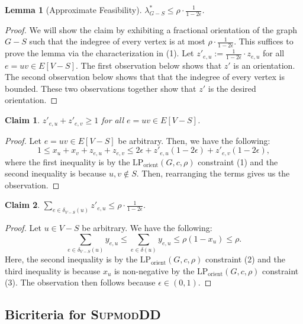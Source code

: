 \documentclass{article}
\newtheorem{lemma}{Lemma}[section]
\newtheorem{claim}{Claim}[section]
\newcommand{\supmoddensitydeletionset}{\textsc{SupmodDD}\xspace}
\begin{document}
\begin{lemma}[Approximate Feasibility] \label{lem:bicriteria-LP-rounding:approximate-feasibility}
    $\lambda^*_{G - S} \leq \rho\cdot \frac{1}{1 - 2\epsilon}$.
\end{lemma}
\begin{proof}
    We will show the claim by exhibiting a fractional orientation of the graph $G-S$ such that the indegree of every vertex is at most $\rho\cdot \frac{1}{1 - 2\epsilon}$. This suffices to prove the lemma via the characterization in  (1). 
    Let $z'_{e, u} := \frac{1}{1 - 2\epsilon}\cdot z_{e,u}$ for all $e = uv \in E[V - S]$. The first observation below shows that $z'$ is an orientation. The second observation below shows that that the indegree of every vertex is bounded.
    These two observations together show that $z'$ is the desired orientation. 
    \end{proof}
    \begin{claim}
        $z'_{e, u} + z'_{e,v} \geq 1$ for all $e = uv \in E[V - S]$.
    \end{claim}
    \begin{proof}
        Let $e = uv \in E[V - S]$ be arbitrary. Then, we have the following:
        $$1 \leq x_u + x_v + z_{e, u} + z_{e, v} \leq 2\epsilon + z'_{e,u}(1-2\epsilon) + z'_{e,v}(1 - 2\epsilon),$$
        where the first inequality is by the $\text{LP}_{\text{orient}}(G,c,\rho)$ constraint (1) and the second inequality is because $u, v \not \in S$. Then, rearranging the terms gives us the observation.
    \end{proof}

    \begin{claim}
        $\sum_{e \in \delta_{V - S}(u)}z'_{e, u} \leq \rho\cdot\frac{1}{1-2\epsilon}$.
    \end{claim}
    \begin{proof}
        Let $u \in V - S$ be arbitrary. We have the following:
        $$\sum_{e \in \delta_{V - S}(u)}y_{e, u} \leq \sum_{e \in \delta(u)}y_{e, u} \leq \rho(1 - x_u) \leq \rho.$$
            Here, the second inequality is by the $\text{LP}_{\text{orient}}(G,c,\rho)$ constraint (2) and the third inequality is because $x_u$ is non-negative by the $\text{LP}_{\text{orient}}(G,c,\rho)$ constraint (3). The observation then follows because $\epsilon \in (0, 1)$.
    \end{proof}

\subsection{Bicriteria for \supmoddensitydeletionset}\label{sec:supmodDD-bicriteria}
\end{document}
